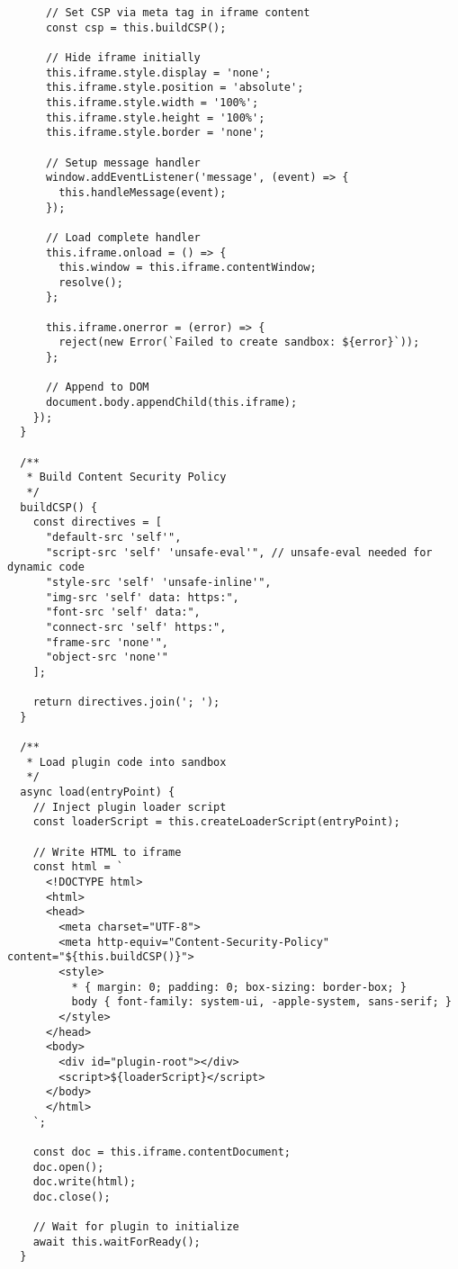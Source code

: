 \documentclass[11pt]{article}
\begin{document}
\begin{verbatim}
      // Set CSP via meta tag in iframe content
      const csp = this.buildCSP();
      
      // Hide iframe initially
      this.iframe.style.display = 'none';
      this.iframe.style.position = 'absolute';
      this.iframe.style.width = '100%';
      this.iframe.style.height = '100%';
      this.iframe.style.border = 'none';
      
      // Setup message handler
      window.addEventListener('message', (event) => {
        this.handleMessage(event);
      });
      
      // Load complete handler
      this.iframe.onload = () => {
        this.window = this.iframe.contentWindow;
        resolve();
      };
      
      this.iframe.onerror = (error) => {
        reject(new Error(`Failed to create sandbox: ${error}`));
      };
      
      // Append to DOM
      document.body.appendChild(this.iframe);
    });
  }
  
  /**
   * Build Content Security Policy
   */
  buildCSP() {
    const directives = [
      "default-src 'self'",
      "script-src 'self' 'unsafe-eval'", // unsafe-eval needed for dynamic code
      "style-src 'self' 'unsafe-inline'",
      "img-src 'self' data: https:",
      "font-src 'self' data:",
      "connect-src 'self' https:",
      "frame-src 'none'",
      "object-src 'none'"
    ];
    
    return directives.join('; ');
  }
  
  /**
   * Load plugin code into sandbox
   */
  async load(entryPoint) {
    // Inject plugin loader script
    const loaderScript = this.createLoaderScript(entryPoint);
    
    // Write HTML to iframe
    const html = `
      <!DOCTYPE html>
      <html>
      <head>
        <meta charset="UTF-8">
        <meta http-equiv="Content-Security-Policy" content="${this.buildCSP()}">
        <style>
          * { margin: 0; padding: 0; box-sizing: border-box; }
          body { font-family: system-ui, -apple-system, sans-serif; }
        </style>
      </head>
      <body>
        <div id="plugin-root"></div>
        <script>${loaderScript}</script>
      </body>
      </html>
    `;
    
    const doc = this.iframe.contentDocument;
    doc.open();
    doc.write(html);
    doc.close();
    
    // Wait for plugin to initialize
    await this.waitForReady();
  }
  

\end{verbatim}
\end{document}
